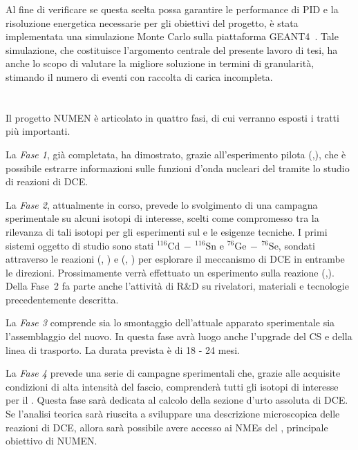 Al fine di verificare se questa scelta possa garantire le performance di PID e la risoluzione energetica necessarie per gli obiettivi del progetto, è stata implementata una simulazione Monte Carlo sulla piattaforma GEANT4~\cite{agostinelli:nima02,allison:nima16,allison:ieeetns06}.
Tale simulazione, che costituisce l'argomento centrale del presente lavoro di tesi, ha anche lo scopo di valutare la migliore soluzione in termini di granularità, stimando il numero di eventi con raccolta di carica incompleta.








\section{}

Il progetto NUMEN è articolato in quattro fasi, di cui verranno esposti i tratti più importanti. 

La \emph{Fase 1}, già completata, ha dimostrato, grazie all'esperimento pilota (,), che è possibile estrarre informazioni sulle funzioni d'onda nucleari del \doppiobeta{} tramite lo studio di reazioni di DCE.

La \emph{Fase 2}, attualmente in corso, prevede lo svolgimento di una campagna sperimentale su alcuni isotopi di interesse, scelti come compromesso tra la rilevanza di tali isotopi per gli esperimenti sul \doppiobeta{} e le esigenze tecniche. I primi sistemi oggetto di studio sono stati $^{116}\mbox{Cd}\,  - \, ^{116}\mbox{Sn} $ e $^{76}\mbox{Ge}\,  - \, ^{76}\mbox{Se} $, sondati attraverso le reazioni (, ) e (, ) per esplorare il meccanismo di DCE in entrambe le direzioni. Prossimamente verrà effettuato un esperimento sulla reazione (,). 
Della Fase~2 fa parte anche l'attività di R\&D su rivelatori, materiali e tecnologie precedentemente descritta.

La \emph{Fase 3} comprende sia lo smontaggio dell'attuale apparato sperimentale sia l'assemblaggio del nuovo. In questa fase avrà luogo anche l'upgrade del CS e della linea di trasporto. La durata prevista è di 18 - 24 mesi.


La \emph{Fase 4} prevede una serie di campagne sperimentali che, grazie alle acquisite condizioni di alta intensità del fascio, comprenderà tutti gli isotopi di interesse per il \doppiobeta{}. 
Questa fase sarà dedicata al calcolo della sezione d'urto assoluta di DCE. Se l'analisi teorica sarà riuscita a sviluppare una descrizione microscopica delle reazioni di DCE, allora sarà possibile avere accesso ai NMEs del \doppiobeta{}, principale obiettivo di NUMEN.










\clearpage
